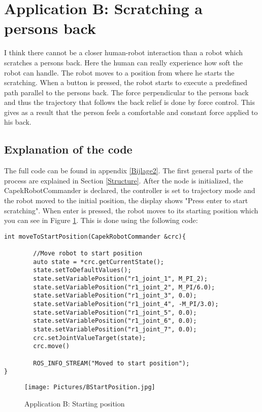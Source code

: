 \documentclass[11pt,a4paper]{report}
\begin{document}
\section{Application B: Scratching a persons back}
I think there cannot be a closer human-robot interaction than a robot which scratches a persons back. Here the human can really experience how soft the robot can handle. The robot moves to a position from where he starts the scratching. When a button is pressed, the robot starts to execute a predefined path parallel to the persons back. The force perpendicular to the persons back and thus the trajectory that follows the back relief is done by force control. This gives as a result that the person feels a comfortable and constant force applied to his back.

\subsection{Explanation of the code}
The full code can be found in appendix \ref{Bijlage2}.
The first general parts of the process are explained in Section \ref{Structure}.
After the node is initialized, the CapekRobotCommander is declared, the controller is set to trajectory mode and the robot moved to the initial position, the display shows "Press enter to start scratching". When enter is pressed, the robot moves to its starting position which you can see in Figure \ref{fig:BStartingPosition}. This is done using the following code:
\begin{verbatim}
int moveToStartPosition(CapekRobotCommander &crc){

	    //Move robot to start position
	    auto state = *crc.getCurrentState();
	    state.setToDefaultValues();
	    state.setVariablePosition("r1_joint_1", M_PI_2);
	    state.setVariablePosition("r1_joint_2", M_PI/6.0);
	    state.setVariablePosition("r1_joint_3", 0.0);
	    state.setVariablePosition("r1_joint_4", -M_PI/3.0);
	    state.setVariablePosition("r1_joint_5", 0.0);
	    state.setVariablePosition("r1_joint_6", 0.0);
	    state.setVariablePosition("r1_joint_7", 0.0);
	    crc.setJointValueTarget(state);
	    crc.move()
	
	    ROS_INFO_STREAM("Moved to start position");
}
\end{verbatim}
\begin{figure}[!ht]
	\centering
	\texttt{[image: Pictures/BStartPosition.jpg]}
	\caption{Application B: Starting position}
	\label{fig:BStartingPosition}
\end{figure}
\newpage
\end{document}
